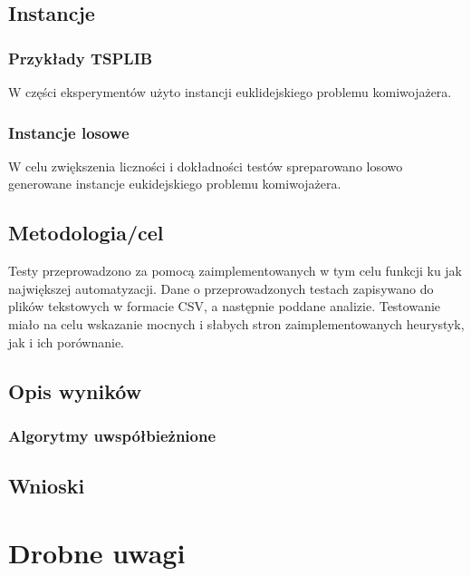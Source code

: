 \documentclass{article}
\begin{document}
\subsection{Instancje}
\subsubsection{Przykłady TSPLIB}
W części eksperymentów użyto instancji euklidejskiego problemu komiwojażera.

\subsubsection{Instancje losowe}
W celu zwiększenia liczności i dokładności testów spreparowano losowo generowane instancje eukidejskiego problemu komiwojażera.

\subsection{Metodologia/cel}

Testy przeprowadzono za pomocą zaimplementowanych w tym celu funkcji ku jak największej automatyzacji. Dane o przeprowadzonych testach zapisywano do plików tekstowych w formacie CSV, a następnie poddane analizie. Testowanie miało na celu wskazanie mocnych i słabych stron zaimplementowanych heurystyk, jak i ich porównanie.

\subsection{Opis wyników}


\subsubsection{Algorytmy uwspółbieżnione}


\subsection{Wnioski}


\section*{Drobne uwagi}
\end{document}

